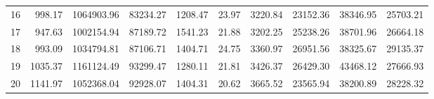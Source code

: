 \begin{tabular}{lrrrrrrrrr}
16  &  998.17 &   1064903.96 &    83234.27 &    1208.47 &   23.97 &    3220.84 &  23152.36 &   38346.95 & 25703.21 \\
17  &  947.63 &   1002154.94 &    87189.72 &    1541.23 &   21.88 &    3202.25 &  25238.26 &   38701.96 & 26664.18 \\
18  &  993.09 &   1034794.81 &    87106.71 &    1404.71 &   24.75 &    3360.97 &  26951.56 &   38325.67 & 29135.37 \\
19  & 1035.37 &   1161124.49 &    93299.47 &    1280.11 &   21.81 &    3426.37 &  26429.30 &   43468.12 & 27666.93 \\
20  & 1141.97 &   1052368.04 &    92928.07 &    1404.31 &   20.62 &    3665.52 &  23565.94 &   38200.89 & 28228.32 \\
\bottomrule
\end{tabular}
